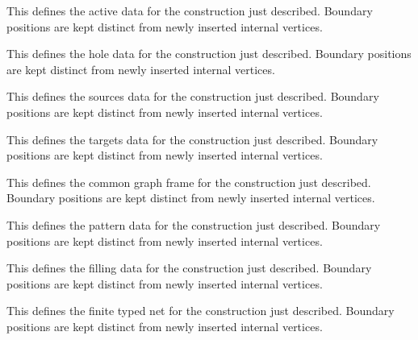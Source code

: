 This defines the active data for the construction just described. Boundary positions are kept distinct from newly inserted internal vertices.
\par{}

This defines the hole data for the construction just described. Boundary positions are kept distinct from newly inserted internal vertices.
\par{}

This defines the sources data for the construction just described. Boundary positions are kept distinct from newly inserted internal vertices.
\par{}

This defines the targets data for the construction just described. Boundary positions are kept distinct from newly inserted internal vertices.
\par{}

This defines the common graph frame for the construction just described. Boundary positions are kept distinct from newly inserted internal vertices.
\par{}

This defines the pattern data for the construction just described. Boundary positions are kept distinct from newly inserted internal vertices.
\par{}

This defines the filling data for the construction just described. Boundary positions are kept distinct from newly inserted internal vertices.
\par{}

This defines the finite typed net for the construction just described. Boundary positions are kept distinct from newly inserted internal vertices.
\par{}

